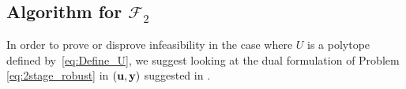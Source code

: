 \documentclass[12pt,x11names]{article}
\theoremstyle{definition}
\newcommand{\bd}{{\bf d}}
\newcommand{\bu}{{\bf u}}
\newcommand{\by}{{\bf y}}
\newcommand{\bbb}{{\bf B}}
\newcommand{\bbc}{{\bf C}}
\newcommand{\bbd}{{\bf D}}
\begin{document}
\subsection{Algorithm for $\mathcal{F}_2$}\label{sec:F2}
In order to prove or disprove infeasibility in the case where $U$ is a polytope defined by~\eqref{eq:Define_U}, we suggest looking at the dual formulation of Problem \eqref{eq:2stage_robust} in $(\bu,\by)$ suggested in \citep{Bertsimas2015}. 
\end{document}
